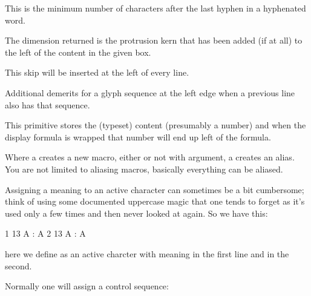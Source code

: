 This is the minimum number of characters after the last hyphen in a hyphenated
word.

\stopoldprimitive

\startnewprimitive[title={\prm {leftmarginkern}}]

The dimension returned is the protrusion kern that has been added (if at all)
to the left of the content in the given box.

\stopnewprimitive

\startoldprimitive[title={\prm {leftskip}}]

This skip will be inserted at the left of every line.

\stopoldprimitive

\startnewprimitive[title={\prm {lefttwindemerits}}]

Additional demerits for a glyph sequence at the left edge when a previous line
also has that sequence.

\stopnewprimitive

\startoldprimitive[title={\prm {leqno}}]

This primitive stores the (typeset) content (presumably a number) and when the
display formula is wrapped that number will end up left of the formula.

\stopoldprimitive

\startoldprimitive[title={\prm {let}}]

Where a  creates a new macro, either or not with argument, a 
creates an alias. You are not limited to aliasing macros, basically everything
can be aliased.

\stopoldprimitive

\startnewprimitive[title={\prm {letcharcode}}]

Assigning a meaning to an active character can sometimes be a bit cumbersome;
think of using some documented uppercase magic that one tends to forget as it's
used only a few times and then never looked at again. So we have this:

\startbuffer
{ 1  13 A : \meaning A}\crlf
{ 2  13 A : \meaning A}\par
\stopbuffer

\typebuffer

here we define  as an active charcter with meaning  in the
first line and  in the second.

{\tttf \getbuffer}

Normally one will assign a control sequence:

